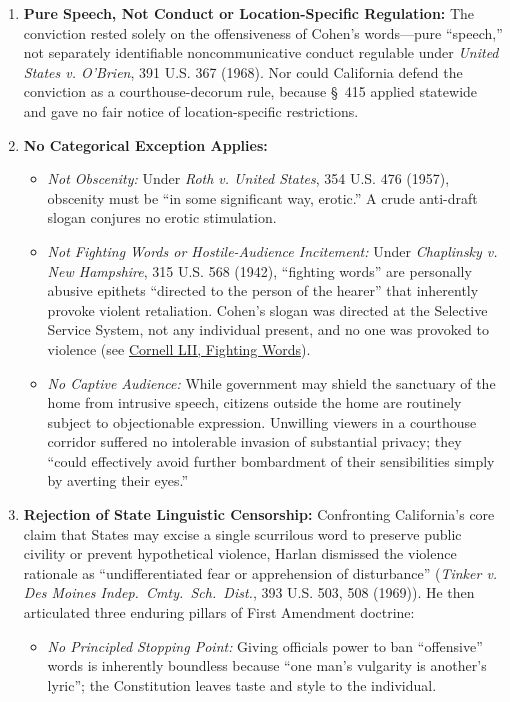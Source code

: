 \documentclass[12pt]{article}
\begin{document}
\begin{enumerate}
  \item \textbf{Pure Speech, Not Conduct or Location-Specific Regulation:} The conviction rested solely on the offensiveness of Cohen's words---pure ``speech,'' not separately identifiable noncommunicative conduct regulable under \textit{United States v. O'Brien}, 391 U.S. 367 (1968). Nor could California defend the conviction as a courthouse-decorum rule, because \S~415 applied statewide and gave no fair notice of location-specific restrictions.
  \item \textbf{No Categorical Exception Applies:}
  \begin{itemize}
    \item \textit{Not Obscenity:} Under \textit{Roth v. United States}, 354 U.S. 476 (1957), obscenity must be ``in some significant way, erotic.'' A crude anti-draft slogan conjures no erotic stimulation.
    \item \textit{Not Fighting Words or Hostile-Audience Incitement:} Under \textit{Chaplinsky v. New Hampshire}, 315 U.S. 568 (1942), ``fighting words'' are personally abusive epithets ``directed to the person of the hearer'' that inherently provoke violent retaliation. Cohen's slogan was directed at the Selective Service System, not any individual present, and no one was provoked to violence (see \href{https://www.law.cornell.edu/constitution-conan/amendment-1/fighting-words}{Cornell LII, Fighting Words}).
    \item \textit{No Captive Audience:} While government may shield the sanctuary of the home from intrusive speech, citizens outside the home are routinely subject to objectionable expression. Unwilling viewers in a courthouse corridor suffered no intolerable invasion of substantial privacy; they ``could effectively avoid further bombardment of their sensibilities simply by averting their eyes.''
  \end{itemize}
  \item \textbf{Rejection of State Linguistic Censorship:} Confronting California's core claim that States may excise a single scurrilous word to preserve public civility or prevent hypothetical violence, Harlan dismissed the violence rationale as ``undifferentiated fear or apprehension of disturbance'' (\textit{Tinker v. Des Moines Indep.\ Cmty.\ Sch.\ Dist.}, 393 U.S. 503, 508 (1969)). He then articulated three enduring pillars of First Amendment doctrine:
  \begin{itemize}
    \item \textit{No Principled Stopping Point:} Giving officials power to ban ``offensive'' words is inherently boundless because ``one man's vulgarity is another's lyric''; the Constitution leaves taste and style to the individual.

\end{itemize}
\end{enumerate}
\end{document}

